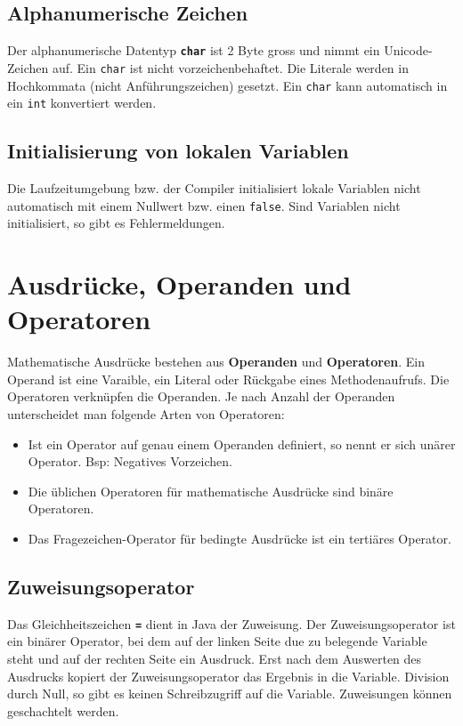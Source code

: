 \subsection{Alphanumerische Zeichen}
Der alphanumerische Datentyp \textbf{\texttt{char}} ist 2 Byte gross und nimmt ein Unicode-Zeichen auf. Ein \texttt{char} ist nicht vorzeichenbehaftet. Die Literale werden in Hochkommata (nicht Anführungszeichen) gesetzt. Ein \texttt{char} kann automatisch in ein \texttt{int} konvertiert werden.
\subsection{Initialisierung von lokalen Variablen}
Die Laufzeitumgebung bzw. der Compiler initialisiert lokale Variablen nicht automatisch mit einem Nullwert bzw. einen \texttt{false}. Sind Variablen nicht initialisiert, so gibt es Fehlermeldungen.
\section{Ausdrücke, Operanden und Operatoren}
Mathematische Ausdrücke bestehen aus \textbf{Operanden} und \textbf{Operatoren}. Ein Operand ist eine Varaible, ein Literal oder Rückgabe eines Methodenaufrufs. Die Operatoren verknüpfen die Operanden. Je nach Anzahl der Operanden unterscheidet man folgende Arten von Operatoren:
\begin{itemize}
\item Ist ein Operator auf genau einem Operanden definiert, so nennt er sich unärer Operator. Bsp: Negatives Vorzeichen.
\item Die üblichen Operatoren für mathematische Ausdrücke sind binäre Operatoren.
\item Das Fragezeichen-Operator für bedingte Ausdrücke ist ein tertiäres Operator.
\end{itemize}
\subsection{Zuweisungsoperator}
Das Gleichheitszeichen \textbf{\texttt{=}} dient in Java der Zuweisung. Der Zuweisungsoperator ist ein binärer Operator, bei dem auf der linken Seite due zu belegende Variable steht und auf der rechten Seite ein Ausdruck. Erst nach dem Auswerten des Ausdrucks kopiert der Zuweisungsoperator das Ergebnis in die Variable. Division durch Null, so gibt es keinen Schreibzugriff auf die Variable. Zuweisungen können geschachtelt werden.
